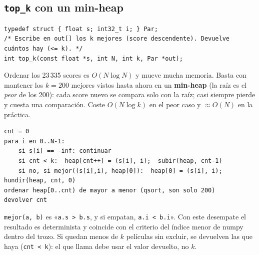 \documentclass[a4paper,11pt]{article}
\newcommand{\cod}[1]{\texttt{#1}}
\begin{document}
\subsection{\texttt{top\_k} con un min-heap}
\begin{lstlisting}[style=c]
typedef struct { float s; int32_t i; } Par;
/* Escribe en out[] los k mejores (score descendente). Devuelve cuántos hay (<= k). */
int top_k(const float *s, int N, int k, Par *out);
\end{lstlisting}
\begin{idea}
Ordenar los 23\,335 scores es $O(N\log N)$ y mueve mucha memoria. Basta con mantener los $k = 200$ mejores vistos
hasta ahora en un \textbf{min-heap} (la raíz es el \emph{peor} de los 200): cada score nuevo se compara solo con la
raíz; casi siempre pierde y cuesta una comparación. Coste $O(N\log k)$ en el peor caso y $\approx O(N)$ en la práctica.
\end{idea}
\begin{lstlisting}
cnt = 0
para i en 0..N-1:
    si s[i] == -inf: continuar
    si cnt < k:  heap[cnt++] = (s[i], i);  subir(heap, cnt-1)
    si no, si mejor((s[i],i), heap[0]):  heap[0] = (s[i], i);  hundir(heap, cnt, 0)
ordenar heap[0..cnt) de mayor a menor (qsort, son solo 200)
devolver cnt
\end{lstlisting}
\cod{mejor(a, b)} es «\cod{a.s > b.s}, y si empatan, \cod{a.i < b.i}». Con este desempate el resultado es
determinista y coincide con el criterio del índice menor de numpy dentro del trozo. Si quedan menos de $k$ películas
sin excluir, se devuelven las que haya (\cod{cnt < k}): el que llama debe usar el valor devuelto, no $k$.
\end{document}
